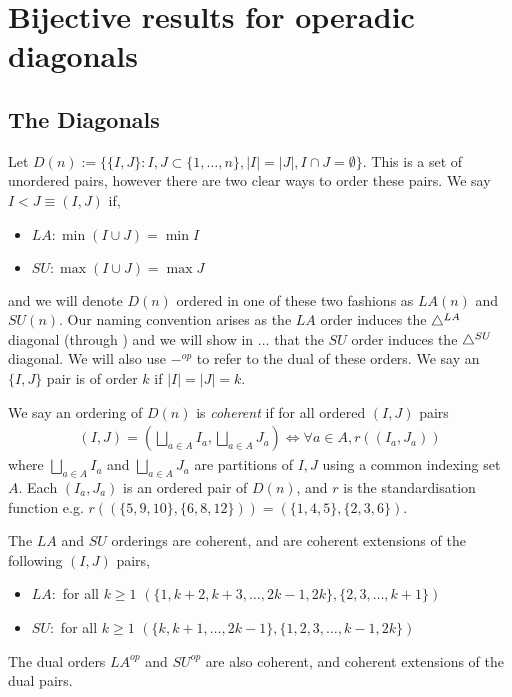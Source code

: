 

\section{Bijective results for operadic diagonals}
\label{s:vertices}

\subsection{The Diagonals}

\begin{definition}
Let $D(n) := \{ \{I,J\}:I,J \subset \{1,\dots,n\}, |I|= |J|, I\cap J = \emptyset \}$.
This is a set of unordered pairs, however there are two clear ways to order these pairs. We say $I<J \equiv (I,J)$ if,
\begin{itemize}
    \item $LA : \min(I\cup J) = \min I$
    \item $SU : \max(I\cup J) = \max J $
\end{itemize}
and we will denote $D(n)$ ordered in one of these two fashions as $LA(n)$ and $SU(n)$.
Our naming convention arises as the $LA$ order induces the $\triangle^{LA}$ diagonal (through \cite[Theorem 3.16]{LA21}) and we will show in ... that the $SU$ order induces the $\triangle^{SU}$ diagonal.
We will also use $-^{op}$ to refer to the dual of these orders. We say an $\{I,J\}$ pair is of order $k$ if $|I| = |J|=k$. 
\end{definition}

\begin{definition}
We say an ordering of $D(n)$ is \emph{coherent} if for all ordered $(I,J)$ pairs 
\begin{align*}
    (I,J) = (\bigsqcup_{a\in A} I_a, \bigsqcup_{a \in A} J_a) \iff \forall a \in A, r((I_a, J_a))
\end{align*}
where $\bigsqcup_{a\in A} I_a$ and $\bigsqcup_{a \in A} J_a$ are partitions of $I,J$ using a common indexing set $A$. Each $(I_a,J_a)$ is an ordered pair of $D(n)$, and $r$ is the standardisation function e.g. $r( (\{5,9,10\},\{6,8,12\})) = (\{1,4,5\},\{2,3,6\})$.
\end{definition}

\begin{lemma} \label{coherent lemma}
The $LA$ and $SU$ orderings are coherent, and are coherent extensions of the following $(I,J)$ pairs,
\begin{itemize}
    \item ${LA} :$ for all $k\geq 1$  $(\{1,k+2,k+3,\dots,2k-1,2k\}, \{2,3,\dots,k+1\})$
    \item ${SU} :$ for all $k\geq 1$  $(\{k,k+1,\dots,2k-1\},\{1,2,3,\dots,k-1,2k\})$
\end{itemize}
The dual orders $LA^{op}$ and $SU^{op}$ are also coherent, and coherent extensions of the dual pairs.
\end{lemma}

